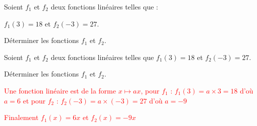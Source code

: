 \begin{exercice*}
    Soient $f_1$ et $f_2$ deux fonctions linéaires telles que : 
    
    $f_1(3)=18$ et $f_2(-3)=27$.

    Déterminer les fonctions $f_1$ et $f_2$.
\end{exercice*}
\begin{corrige}
    Soient $f_1$ et $f_2$ deux fonctions linéaires telles que $f_1(3)=18$ et $f_2(-3)=27$.

    Déterminer les fonctions $f_1$ et $f_2$.
    
    \textcolor{red}{Une fonction linéaire est de la forme $x\longmapsto ax$, pour $f_1$ : $f_1(3)=a\times 3 = 18$ d'où $a=6$ et pour $f_2$ : $f_2(-3)=a\times (-3) = 27$ d'où $a=-9$} 

    \textcolor{red}{Finalement $f_1(x)=6x$ et $f_2(x)=-9x$} 
\end{corrige}

